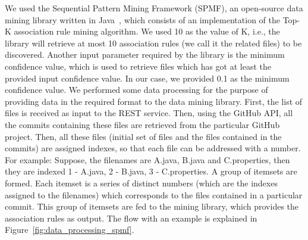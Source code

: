 We used the Sequential Pattern Mining Framework (SPMF), an open-source data mining library written in Java~\cite{algo_impl}, which consists of an implementation of the Top-K association rule mining algorithm. We used 10 as the value of K, i.e., the library will retrieve at most 10 association rules (we call it the related files) to be discovered. Another input parameter required by the library is the minimum confidence value, which is used to retrieve files which has got at least the provided input confidence value. In our case, we provided 0.1 as the minimum confidence value. We performed some data processing for the purpose of providing data in the required format to the data mining library. First, the list of files is received as input to the REST service. Then, using the GitHub API, all the commits containing these files are retrieved from the particular GitHub project. Then, all these files (initial set of files and the files contained in the commits) are assigned indexes, so that each file can be addressed with a number. For example: Suppose, the filenames are A.java, B.java and C.properties, then they are indexed 1 - A.java, 2 - B.java, 3 - C.properties. A group of itemsets are formed. Each itemset is a series of distinct numbers (which are the indexes assigned to the filenames) which corresponds to the files contained in a particular commit. This group of itemsets are fed to the mining library, which provides the association rules as output. The flow with an example is explained in Figure~\ref{fig:data_processing_spmf}.
